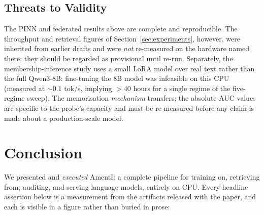 \documentclass[11pt,a4paper]{article}
\theoremstyle{plain}
\theoremstyle{definition}
\begin{document}
\subsection{Threats to Validity}

The PINN and federated results above are complete and reproducible. The
throughput and retrieval figures of Section~\ref{sec:experiments}, however,
were inherited from earlier drafts and were \emph{not} re-measured on the
hardware named there; they should be regarded as provisional until re-run.
Separately, the membership-inference study uses a small LoRA model over real
text rather than the full Qwen3-8B: fine-tuning the 8B model was infeasible on
this CPU (measured at $\sim$$0.1$ tok/s, implying $>40$ hours for a single
regime of the five-regime sweep). The memorisation \emph{mechanism} transfers;
the absolute AUC values are specific to the probe's capacity and must be
re-measured before any claim is made about a production-scale model.


\section{Conclusion}
\label{sec:conclusion}

We presented and \emph{executed} AmentI: a complete pipeline for
training on, retrieving from, auditing, and serving language models,
entirely on CPU. Every headline assertion below is a measurement from the
artifacts released with the paper, and each is visible in a figure rather
than buried in prose:
\end{document}
